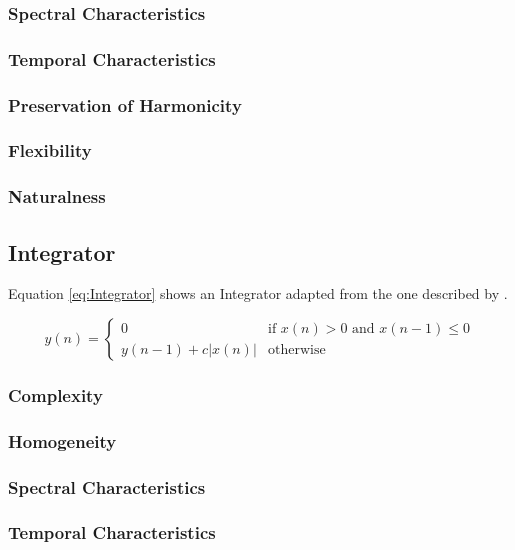 		\subsubsection*{Spectral Characteristics}
		\subsubsection*{Temporal Characteristics}
		\subsubsection*{Preservation of Harmonicity}
		\subsubsection*{Flexibility}
		\subsubsection*{Naturalness}

	\subsection{Integrator}
	\label{sec:Excitation-Integrator}
		Equation \ref{eq:Integrator} shows an Integrator adapted from the one described by \citet{larsen2004audio}.

		\begin{equation}
			y(n) = \begin{cases}
				0 & \text{if $x(n) > 0$ and $x(n - 1) \leq 0$} \\
				y(n - 1) + c|x(n)| & \text{otherwise}
			\end{cases}
			\label{eq:Integrator}
		\end{equation}

		\subsubsection*{Complexity}
		\subsubsection*{Homogeneity}
		\subsubsection*{Spectral Characteristics}
		\subsubsection*{Temporal Characteristics}
